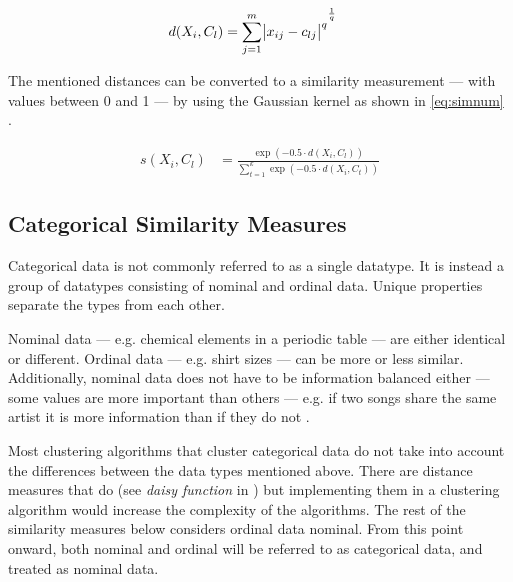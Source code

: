 \documentclass[../report.tex]{subfiles}
\begin{document}
\begin{align}
  \label{eq:mikowski}
  d(X_i,C_l) &= {\sum^{m}_{j=1}\abs{x_{ij} - c_{lj}}^q}^{\frac{1}{q}}
\end{align}



The mentioned distances can be converted to a similarity measurement --- with values between 0 and 1 --- by using the Gaussian kernel as shown in \cref{eq:simnum} \cite{Cheung2013}.

\begin{align}
  \label{eq:simnum}
    s(X_i,C_l) &= \frac{\exp(-0.5 \cdot d(X_i,C_l))}{\sum^k_{t=1}\exp(-0.5 \cdot d(X_i,C_t))}
\end{align}


\subsection{Categorical Similarity Measures}
Categorical data is not commonly referred to as a single datatype. It is instead a group of datatypes consisting of nominal and ordinal data. Unique properties separate the types from each other.

Nominal data --- e.g. chemical elements in a periodic table  --- are either identical or different. Ordinal data --- e.g. shirt sizes --- can be more or less similar. Additionally, nominal data does not have to be information balanced either --- some values are more important than others --- e.g. if two songs share the same artist it is more information than if they do not \cite{Kaufman1990}.

Most clustering algorithms that cluster categorical data do not take into account the differences between the data types mentioned above. There are distance measures that do (see \textit{daisy function} in \cite{Kaufman1990}) but implementing them in a clustering algorithm would increase the complexity of the algorithms. The rest of the similarity measures below considers ordinal data nominal. From this point onward, both nominal and ordinal will be referred to as categorical data, and treated as nominal data.
\end{document}
